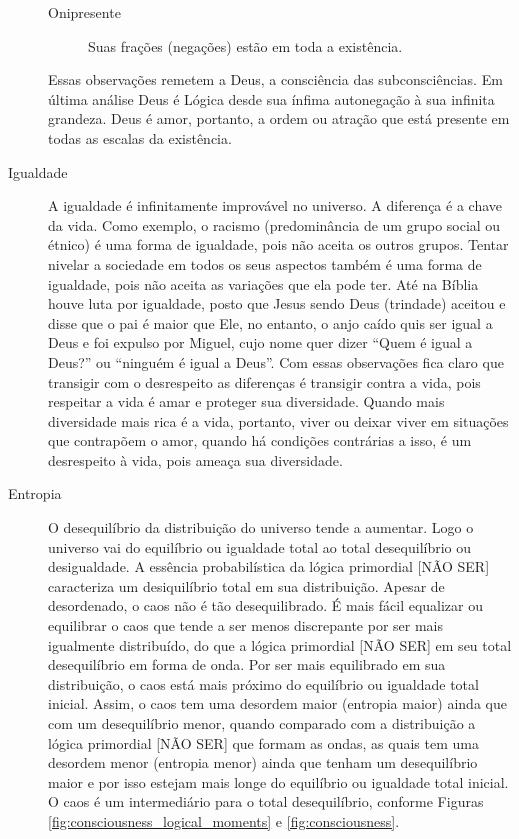 \begin{description}
\begin{description}
		   \item[Onipresente] Suas frações (negações) estão em toda a existência.
	   \end{description}
	Essas observações remetem a Deus, a consciência das subconsciências. Em última análise Deus é Lógica desde sua ínfima autonegação à sua infinita grandeza. Deus é amor, portanto, a ordem ou atração que está presente em todas as escalas da existência.
	   \item[Igualdade] A igualdade é infinitamente improvável no universo. A diferença é a chave da vida. Como exemplo, o racismo (predominância de um grupo social ou étnico) é uma forma de igualdade, pois não aceita os outros grupos. Tentar nivelar a sociedade em todos os seus aspectos também é uma forma de igualdade, pois não aceita as variações que ela pode ter. Até na Bíblia houve luta por igualdade, posto que Jesus sendo Deus (trindade) aceitou e disse que o pai é maior que Ele, no entanto, o anjo caído quis ser igual a Deus e foi expulso por Miguel, cujo nome quer dizer “Quem é igual a Deus?” ou “ninguém é igual a Deus”. Com essas observações fica claro que transigir com o desrespeito as diferenças é transigir contra a vida, pois respeitar a vida é amar e proteger sua diversidade. Quando mais diversidade mais rica é a vida, portanto, viver ou deixar viver em situações que contrapõem o amor, quando há condições contrárias a isso, é um desrespeito à vida, pois ameaça sua diversidade. 
	   \item[Entropia] O desequilíbrio da distribuição do universo tende a aumentar. Logo o universo vai do equilíbrio ou igualdade total ao total desequilíbrio ou desigualdade. A essência probabilística da lógica primordial [NÃO SER] caracteriza um desiquilíbrio total em sua distribuição. Apesar de desordenado, o caos não é tão desequilibrado. É mais fácil equalizar ou equilibrar o caos que tende a ser menos discrepante por ser mais igualmente distribuído, do que a lógica primordial [NÃO SER] em seu total desequilíbrio em forma de onda. Por ser mais equilibrado em sua distribuição, o caos está mais próximo do equilíbrio ou igualdade total inicial. Assim, o caos tem uma desordem maior (entropia maior) ainda que com um desequilíbrio menor, quando comparado com a distribuição a lógica primordial [NÃO SER] que formam as ondas, as quais tem uma desordem menor (entropia menor) ainda que tenham um desequilíbrio maior e por isso estejam mais longe do equilíbrio ou igualdade total inicial. O caos é um intermediário para o total desequilíbrio, conforme Figuras \ref{fig:consciousness_logical_moments} e \ref{fig:consciousness}.

\end{description}
